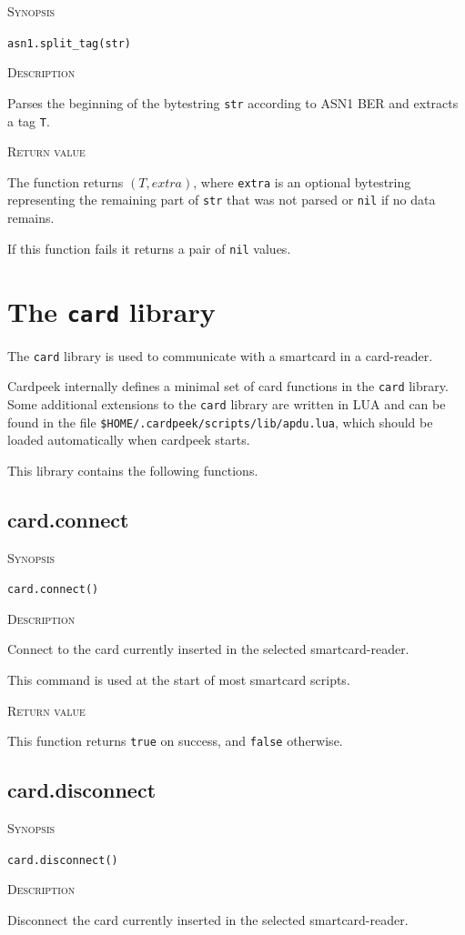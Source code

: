 \documentclass[11pt]{report}
\newcommand{\mansection}[1]{\vspace{0.5em}\par\noindent\textsc{#1}\vspace{0.5em}\par}
\newcommand{\syn}[1]{\texttt{#1}}
\begin{document}
\mansection{Synopsis}
\syn{asn1.split\_tag(str)}

\mansection{Description}
  Parses the beginning of the bytestring \syn{str} according to ASN1 BER 
  and extracts a tag \syn{T}. 

\mansection{Return value}
  The function returns $(T, extra)$, where \syn{extra} is an optional bytestring 
  representing the remaining part of \syn{str} that was not parsed or 
  \syn{nil} if no data remains.

  If this function fails it returns a pair of \syn{nil} values.


\section{The \syn{card} library}

The \syn{card} library is used to communicate with a smartcard in a card-reader.

Cardpeek internally defines a minimal set of card functions in the \syn{card} 
library.
Some additional extensions to the \syn{card} library are written in LUA and can
be found in the file \syn{\$HOME/.cardpeek/scripts/lib/apdu.lua}, which should 
be loaded automatically when cardpeek starts.

This library contains the following functions.


\subsection{card.connect}

\mansection{Synopsis}
\syn{card.connect()}

\mansection{Description}
  Connect to the card currently inserted in the selected smartcard-reader. 

  This command is used at the start of most smartcard scripts.

\mansection{Return value}
   This function returns \syn{true} on success, and \syn{false} otherwise.


\subsection{card.disconnect}

\mansection{Synopsis}
\syn{card.disconnect()}

\mansection{Description}
  Disconnect the card currently inserted in the selected smartcard-reader.
	  
\end{document}
